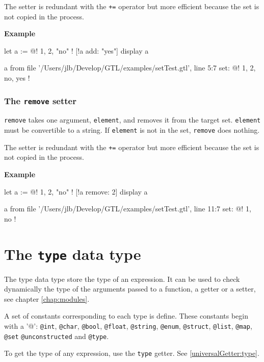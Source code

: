 \documentclass[10pt,openright,twosides,final]{memoir}
\newcommand{\gtltype}[1]{{\small\ttfamily #1}}
\newcommand{\ccst}[1]{{\footnotesize\ttfamily\colorbox{light-blue}{'#1'}}}
\newcommand{\gtlinline}[1]{\colorbox{light-blue}{\lstinline[language=gtl]{#1}}}
\newcommand{\example}{\vspace{.75em}\noindent\textbf{Example}\vspace{0em}}
\begin{document}
The setter is redundant with the \gtlinline{+=} operator but more efficient because the set is not copied in the process.

\example
\begin{gtl}
let a := @! 1, 2, "no" !
[!a add: "yes"]
display a
\end{gtl}
\begin{console}
a from file '/Users/jlb/Develop/GTL/examples/setTest.gtl', line 5:7
    set: @!
        1, 2, no, yes
    !
\end{console}

\subsubsection{The \texttt{remove} setter}

\gtlinline{remove} takes one argument, \gtlinline{element}, and removes it from the target set. \gtlinline{element} must be convertible to a string. If \gtlinline{element} is not in the set, \gtlinline{remove} does nothing.

The setter is redundant with the \gtlinline{+=} operator but more efficient because the set is not copied in the process.

\example
\begin{gtl}
let a := @! 1, 2, "no" !
[!a remove: 2]
display a
\end{gtl}
\begin{console}
a from file '/Users/jlb/Develop/GTL/examples/setTest.gtl', line 11:7
    set: @!
        1, no
    !
\end{console}

\section{The \texttt{type} data type}
\label{sec:type}

The \gtltype{type} data type store the type of an expression. It can be used to check dynamically the type of the arguments passed to a function, a getter or a setter, see chapter \ref{chap:modules}.

A set of constants corresponding to each type is define. These constants begin with a \ccst{@}: \gtlinline{@int}, \gtlinline{@char}, \gtlinline{@bool}, \gtlinline{@float}, \gtlinline{@string}, \gtlinline{@enum}, \gtlinline{@struct}, \gtlinline{@list}, \gtlinline{@map}, \gtlinline{@set} \gtlinline{@unconstructed} and \gtlinline{@type}.

To get the type of any expression, use the \gtlinline{type} getter. See \ref{universalGetter:type}.
\end{document}

